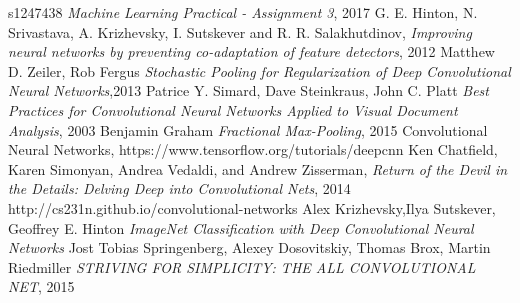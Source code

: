 \documentclass[12pt]{article}
\begin{document}
\begin{thebibliography}{1}
 s1247438 {\em Machine Learning Practical - Assignment 3}, 2017 
 G. E. Hinton, N. Srivastava, A. Krizhevsky, I. Sutskever and R. R. Salakhutdinov, {\em Improving neural networks by preventing co-adaptation of feature detectors}, 2012
 Matthew D. Zeiler, Rob Fergus {\em Stochastic Pooling for Regularization of Deep Convolutional Neural Networks},2013
 Patrice Y. Simard, Dave Steinkraus, John C. Platt {\em Best Practices for Convolutional Neural Networks Applied to Visual Document Analysis}, 2003
 Benjamin Graham {\em Fractional Max-Pooling}, 2015
 Convolutional Neural Networks, https://www.tensorflow.org/tutorials/deepcnn
 Ken Chatfield, Karen Simonyan, Andrea Vedaldi, and Andrew Zisserman, {\em Return of the Devil in the Details: Delving Deep into Convolutional Nets}, 2014
 http://cs231n.github.io/convolutional-networks
 Alex Krizhevsky,Ilya Sutskever, Geoffrey E. Hinton {\em ImageNet Classification with Deep Convolutional Neural Networks}
 Jost Tobias Springenberg, Alexey Dosovitskiy, Thomas Brox, Martin Riedmiller {\em STRIVING FOR SIMPLICITY: THE ALL CONVOLUTIONAL NET}, 2015




\end{thebibliography}
\end{document}
